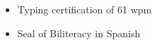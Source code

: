 \begin{itemize}
	\item Typing certification of 61 wpm
	\item Seal of Biliteracy in Spanish
\end{itemize}